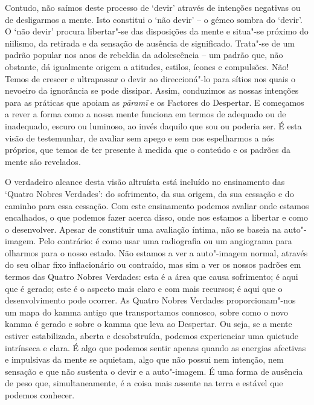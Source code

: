 Contudo, não saímos deste processo de `devir' através de intenções negativas ou
de desligarmos a mente. Isto constitui o `não devir' -- o gémeo sombra do
`devir'. O `não devir' procura libertar"-se das disposições da mente e situa"-se
próximo do niilismo, da retirada e da sensação de ausência de significado.
Trata"-se de um padrão popular nos anos de rebeldia da adolescência -- um padrão
que, não obstante, dá igualmente origem a atitudes, estilos, ícones e
compulsões. Não! Temos de crescer e ultrapassar o devir ao direccioná"-lo para
sítios nos quais o nevoeiro da ignorância se pode dissipar. Assim, conduzimos as
nossas intenções para as práticas que apoiam as \emph{pāramī} e os Factores do
Despertar. E começamos a rever a forma como a nossa mente funciona em termos de
adequado ou de inadequado, escuro ou luminoso, ao invés daquilo que sou ou
poderia ser. É esta visão de testemunhar, de avaliar sem apego e sem nos
espelharmos a nós próprios, que temos de ter presente à medida que o conteúdo e
os padrões da mente são revelados.

O verdadeiro alcance desta visão altruísta está incluído no ensinamento das
`Quatro Nobres Verdades': do sofrimento, da sua origem, da sua cessação e do
caminho para essa cessação. Com este ensinamento podemos avaliar onde estamos
encalhados, o que podemos fazer acerca disso, onde nos estamos a libertar e como
o desenvolver. Apesar de constituir uma avaliação íntima, não se baseia na
auto"-imagem. Pelo contrário: é como usar uma radiografia ou um angiograma para
olharmos para o nosso estado. Não estamos a ver a auto"-imagem normal, através
do seu olhar fixo inflacionário ou contraído, mas sim a ver os nossos padrões em
termos das Quatro Nobres Verdades: esta é a área que causa sofrimento; é aqui
que é gerado; este é o aspecto mais claro e com mais recursos; é aqui que o
desenvolvimento pode ocorrer. As Quatro Nobres Verdades proporcionam"-nos um
mapa do kamma antigo que transportamos connosco, sobre como o novo kamma é
gerado e sobre o kamma que leva ao Despertar. Ou seja, se a mente estiver
estabilizada, aberta e desobstruída, podemos experienciar uma quietude
intrínseca e clara. É algo que podemos sentir apenas quando as energias
afectivas e impulsivas da mente se aquietam, algo que não possui nem intenção,
nem sensação e que não sustenta o devir e a auto"-imagem. É uma forma de
ausência de peso que, simultaneamente, é a coisa mais assente na terra e estável
que podemos conhecer.

